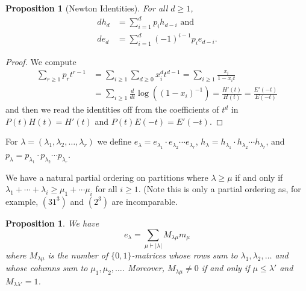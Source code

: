 \documentclass[12pt]{article}
\theoremstyle{plain}
\newtheorem{proposition}[theorem]{Proposition}
\theoremstyle{definition}
\theoremstyle{remark}
\numberwithin{equation}{section}
\begin{document}
\begin{proposition}[Newton Identities] For all $d \ge 1$,
\begin{align*}
dh_d&=\sum_{i=1}^d p_i h_{d-i} \textrm{ and} \\ 
de_d&=\sum_{i=1}^d (-1)^{i-1} p_i e_{d-i}.
\end{align*}
\end{proposition}

\begin{proof}
We compute
\begin{align*}
\sum_{r \ge 1} p_r t^{r-1}
&= \sum_{i \ge 1} \sum_{d \ge 0} x_i^d t^{d-1}
= \sum_{i \ge 1} \frac{x_i}{1-x_it}\\
&= \sum_{i \ge 1} \frac{d}{dt}\log\left(
\left(1-x_i\right)^{-1}\right)
= \frac{H'(t)}{H(t)} = \frac{E'(-t)}{E(-t)}
\end{align*}
and then we read the identities off from 
the coefficients of $t^d$ in $P(t)H(t)=H'(t)$
and $P(t)E(-t)=E'(-t)$.
\end{proof}

For $\lambda=(\lambda_1,\lambda_2,\ldots,\lambda_r)$ we define
$e_\lambda = e_{\lambda_1}\cdot e_{\lambda_2} \cdots e_{\lambda_r}$,
$h_\lambda = h_{\lambda_1}\cdot h_{\lambda_2} \cdots h_{\lambda_r}$, and
$p_\lambda = p_{\lambda_1}\cdot p_{\lambda_2} \cdots p_{\lambda_r}$.

We have a natural partial ordering on partitions where $\lambda \ge \mu$
if and only if
$\lambda_1 + \cdots + \lambda_i \ge \mu_1 + \cdots \mu_i$
for all $i \ge 1$.
(Note this is only a partial ordering as, for example, $(31^3)$ and $(2^3)$
are incomparable.

\begin{proposition} \label{prop:01matrix}
We have
\[
e_\lambda = \sum_{\mu \vdash |\lambda|} M_{\lambda \mu} m_\mu
\]
where $M_{\lambda \mu}$ is the number of $\{0,1\}$-matrices whose
rows sum to $\lambda_1,\lambda_2,\ldots$ and whose columns
sum to $\mu_1,\mu_2,\ldots$.
Moreover, $M_{\lambda\mu} \ne 0$ if and only if $\mu \le \lambda'$
and $M_{\lambda\lambda'}=1$.
\end{proposition}
\end{document}
